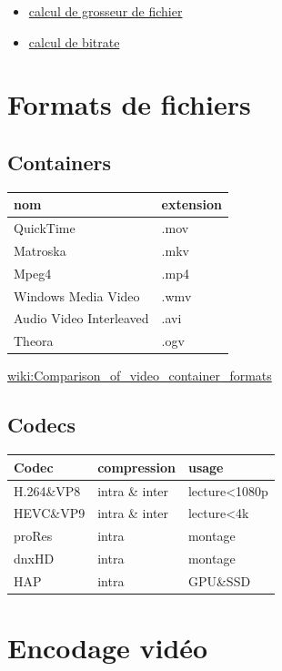 \documentclass[
]{book}
\providecommand{\tightlist}{%
  \setlength{\itemsep}{0pt}\setlength{\parskip}{0pt}}
\begin{document}
\begin{itemize}
\tightlist
\item
  \href{https://toolstud.io/video/filesize.php?imagewidth=1920\&imageheight=1080\&framerate=29.97\&timeduration=60\&timeunit=seconds}{calcul de grosseur de fichier}
\item
  \href{https://toolstud.io/video/bitrate.php?imagewidth=1\&imageheight=1\&colordepth=24\&framerate=29.97}{calcul de bitrate}
\end{itemize}

\hypertarget{lexique_fichiers}{%
\section{Formats de fichiers}\label{lexique_fichiers}}

\hypertarget{containers}{%
\subsection{Containers}\label{containers}}

\begin{longtable}[]{@{}ll@{}}
\toprule
nom & extension\tabularnewline
\midrule
\endhead
QuickTime & .mov\tabularnewline
Matroska & .mkv\tabularnewline
Mpeg4 & .mp4\tabularnewline
Windows Media Video & .wmv\tabularnewline
Audio Video Interleaved & .avi\tabularnewline
Theora & .ogv\tabularnewline
\bottomrule
\end{longtable}

\href{https://en.wikipedia.org/wiki/Comparison_of_video_container_formats}{wiki:Comparison\_of\_video\_container\_formats}

\hypertarget{codecs}{%
\subsection{Codecs}\label{codecs}}

\begin{longtable}[]{@{}lll@{}}
\toprule
Codec & compression & usage\tabularnewline
\midrule
\endhead
H.264\&VP8 & intra \& inter & lecture\textless1080p\tabularnewline
HEVC\&VP9 & intra \& inter & lecture\textless4k\tabularnewline
proRes & intra & montage\tabularnewline
dnxHD & intra & montage\tabularnewline
HAP & intra & GPU\&SSD\tabularnewline
\bottomrule
\end{longtable}

\hypertarget{encodage-viduxe9o}{%
\section{Encodage vidéo}\label{encodage-viduxe9o}}
\end{document}
